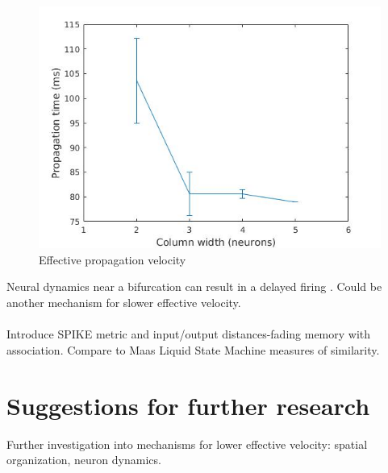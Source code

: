 \documentclass[a4paper,11pt]{article}
\begin{document}
\\
\begin{figure}[ht]
 \caption{Effective propagation velocity}
 \centering
   \includegraphics[width=\textwidth]{fig/propagation_time}
\end{figure}
Neural dynamics near a bifurcation can result in a delayed firing \cite{izhikevich}.
Could be another mechanism for slower effective velocity.
\\ \\
Introduce SPIKE metric and input/output distances-fading memory with association.
Compare to Maas Liquid State Machine measures of similarity.
\\
\section{Suggestions for further research}
Further investigation into mechanisms for lower effective velocity: spatial organization, neuron dynamics.\\

\printbibliography
\end{document}
